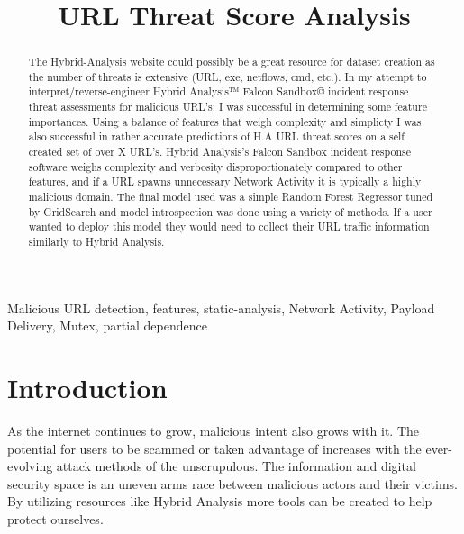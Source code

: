 \documentclass[conference]{IEEEtran}
\begin{document}
\title{URL Threat Score Analysis\\
}

\author{
}

\maketitle

\begin{abstract}
The Hybrid-Analysis website could possibly be a great resource for dataset creation as the number of threats is extensive (URL, exe, netflows, cmd, etc.). In my attempt to interpret/reverse-engineer Hybrid Analysis™ Falcon Sandbox© incident response threat assessments for malicious URL's; I was successful in determining some feature importances. Using a balance of features that weigh complexity and simplicty I was also successful in rather accurate predictions of H.A URL threat scores on a self created set of over X URL's. Hybrid Analysis's Falcon Sandbox incident response software weighs complexity and verbosity disproportionately compared to other features, and if a URL spawns unnecessary Network Activity it is typically a highly malicious domain. The final model used was a simple Random Forest Regressor tuned by GridSearch and model introspection was done using a variety of methods. If a user wanted to deploy this model they would need to collect their URL traffic information similarly to Hybrid Analysis.
\end{abstract}

\begin{IEEEkeywords}
Malicious URL detection, features, static-analysis, Network Activity, Payload Delivery, Mutex, partial dependence
\end{IEEEkeywords}

\section{Introduction}
As the internet continues to grow, malicious intent also grows with it. The potential for users to be scammed or taken advantage of increases with the ever-evolving attack methods of the unscrupulous. The information and digital security space is an uneven arms race between malicious actors and their victims. By utilizing resources like Hybrid Analysis more tools can be created to help protect ourselves.
\end{document}

